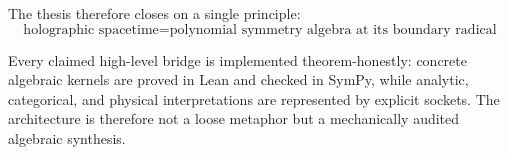 The thesis therefore closes on a single principle:
\begin{equation}
    \boxed{
    \text{holographic spacetime}
    =
    \text{polynomial symmetry algebra at its boundary radical}
    }
\end{equation}

Every claimed high-level bridge is implemented theorem-honestly: concrete algebraic kernels are proved in Lean and checked in SymPy, while analytic, categorical, and physical interpretations are represented by explicit sockets.  The architecture is therefore not a loose metaphor but a mechanically audited algebraic synthesis.
